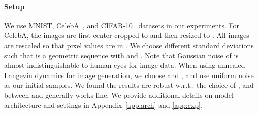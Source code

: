 \documentclass{article}
\makeatletter
\def\@onedot{\ifx\@let@token.\else.\null\fi\xspace}
\DeclareRobustCommand\onedot{\futurelet\@let@token\@onedot}
\def\wrt{w.r.t\onedot}
\makeatother
\begin{document}
\paragraph{Setup} We use MNIST, CelebA~\cite{liu2015faceattributes}, and CIFAR-10~\cite{Krizhevsky09learningmultiple} datasets in our experiments. For CelebA, the images are first center-cropped to  and then resized to . All images are rescaled so that pixel values are in . We choose  different standard deviations such that  is a geometric sequence with  and . Note that Gaussian noise of  is almost indistinguishable to human eyes for image data. When using annealed Langevin dynamics for image generation, we choose  and , and use uniform noise as our initial samples. We found the results are robust \wrt the choice of , and  between  and  generally works fine. We provide additional details on model architecture and settings in Appendix~\ref{app:arch} and \ref{app:exp}.
\end{document}
